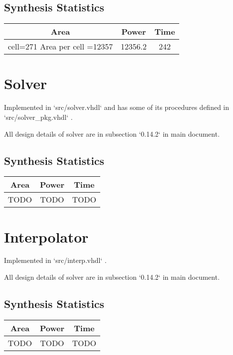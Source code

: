 \documentclass[12pt]{report}
\begin{document}
    \subsection{Synthesis Statistics}
    \begin{tabular}{||c|c|c||}
        \hline
        Area & Power & Time\\\hline\hline
        cell=271 Area per cell =12357 & 12356.2 & 242\\\hline
    \end{tabular}

    \section{Solver}
    Implemented in `src/solver.vhdl` and has some of its procedures defined in `src/solver\_pkg.vhdl` . 

    All design details of solver are in subsection `0.14.2` in main document. 
    \subsection{Synthesis Statistics}
    \begin{tabular}{||c|c|c||}
        \hline
        Area & Power & Time\\\hline\hline
        TODO & TODO & TODO\\\hline
    \end{tabular}

    \section{Interpolator}
    Implemented in `src/interp.vhdl` . 

    All design details of solver are in subsection `0.14.2` in main document. 
    \subsection{Synthesis Statistics}
    \begin{tabular}{||c|c|c||}
        \hline
        Area & Power & Time\\\hline\hline
        TODO & TODO & TODO\\\hline
    \end{tabular}
\end{document}
